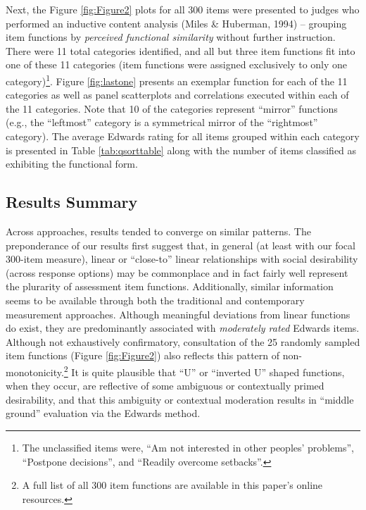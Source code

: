 \documentclass[
  ,jou]{apa6}
\begin{document}
Next, the Figure \ref{fig:Figure2} plots for all 300 items were presented to judges who performed an inductive content analysis (Miles \& Huberman, 1994) -- grouping item functions by \emph{perceived functional similarity} without further instruction. There were 11 total categories identified, and all but three item functions fit into one of these 11 categories (item functions were assigned exclusively to only one category)\footnote{The unclassified items were, ``Am not interested in other peoples' problems'', ``Postpone decisions'', and ``Readily overcome setbacks''.}. Figure \ref{fig:lastone} presents an exemplar function for each of the 11 categories as well as panel scatterplots and correlations executed within each of the 11 categories. Note that 10 of the categories represent ``mirror'' functions (e.g., the ``leftmost'' category is a symmetrical mirror of the ``rightmost'' category). The average Edwards rating for all items grouped within each category is presented in Table \ref{tab:qsorttable} along with the number of items classified as exhibiting the functional form.

\hypertarget{results-summary}{%
\subsection{Results Summary}\label{results-summary}}

Across approaches, results tended to converge on similar patterns. The preponderance of our results first suggest that, in general (at least with our focal 300-item measure), linear or ``close-to'' linear relationships with social desirability (across response options) may be commonplace and in fact fairly well represent the plurarity of assessment item functions. Additionally, similar information seems to be available through both the traditional and contemporary measurement approaches. Although meaningful deviations from linear functions do exist, they are predominantly associated with \emph{moderately rated} Edwards items. Although not exhaustively confirmatory, consultation of the 25 randomly sampled item functions (Figure \ref{fig:Figure2}) also reflects this pattern of non-monotonicity.\footnote{A full list of all 300 item functions are available in this paper's online resources.} It is quite plausible that ``U'' or ``inverted U'' shaped functions, when they occur, are reflective of some ambiguous or contextually primed desirability, and that this ambiguity or contextual moderation results in ``middle ground'' evaluation via the Edwards method.
\end{document}
